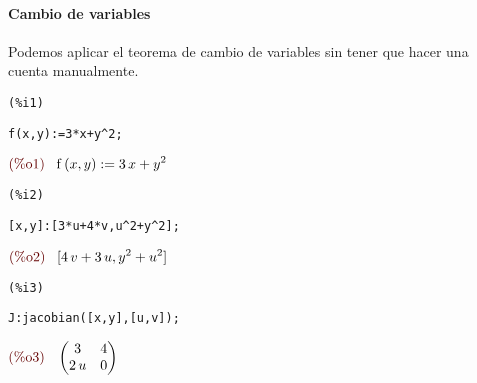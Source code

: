 \documentclass[12pt]{article}
\begin{document}
\paragraph{Cambio de variables} Podemos aplicar el teorema de cambio de variables sin tener que hacer una cuenta manualmente.

\noindent
\begin{minipage}[t]{8ex}{\color{red}\bf
\begin{verbatim}
(%i1) 
\end{verbatim}}
\end{minipage}
\begin{minipage}[t]{\textwidth}{\color{blue}
\begin{verbatim}
f(x,y):=3*x+y^2;
\end{verbatim}}
\end{minipage}
\begin{math}\displaystyle
\parbox{8ex}{\color{labelcolor}(\%o1) }
\mathrm{f}\left( x,y\right) :=3\,x+{y}^{2}
\end{math}


\noindent
\begin{minipage}[t]{8ex}{\color{red}\bf
\begin{verbatim}
(%i2) 
\end{verbatim}}
\end{minipage}
\begin{minipage}[t]{\textwidth}{\color{blue}
\begin{verbatim}
[x,y]:[3*u+4*v,u^2+y^2];
\end{verbatim}}
\end{minipage}
\begin{math}\displaystyle
\parbox{8ex}{\color{labelcolor}(\%o2) }
[4\,v+3\,u,{y}^{2}+{u}^{2}]
\end{math}


\noindent
\begin{minipage}[t]{8ex}{\color{red}\bf
\begin{verbatim}
(%i3) 
\end{verbatim}}
\end{minipage}
\begin{minipage}[t]{\textwidth}{\color{blue}
\begin{verbatim}
J:jacobian([x,y],[u,v]);
\end{verbatim}}
\end{minipage}
\begin{math}\displaystyle
\parbox{8ex}{\color{labelcolor}(\%o3) }
\begin{pmatrix}3 & 4\cr 2\,u & 0\end{pmatrix}
\end{math}
\end{document}
